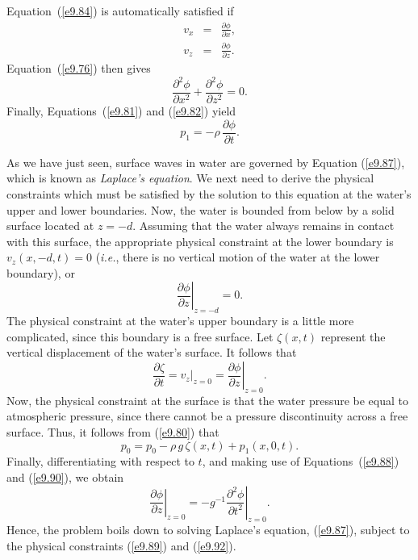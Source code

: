   Equation~(\ref{e9.84}) is automatically satisfied if
  \begin{eqnarray}
  v_x&=&\frac{\partial \phi}{\partial x},\\[0.5ex]
  v_z &=&\frac{\partial \phi}{\partial z}.
  \end{eqnarray}
  Equation~(\ref{e9.76}) then gives
  \begin{equation}\label{e9.87}
  \frac{\partial^2\phi}{\partial x^2} + \frac{\partial^2\phi}{\partial z^2} = 0.
  \end{equation}
  Finally, Equations~(\ref{e9.81}) and (\ref{e9.82}) yield
  \begin{equation}\label{e9.88}
  p_1 = -\rho\,\frac{\partial \phi}{\partial t}.
  \end{equation}

As we have just seen, surface waves in  water are governed by Equation (\ref{e9.87}),
which is known as {\em Laplace's equation}. We next need to derive the physical
constraints which must be satisfied by the solution to this equation at
the water's upper and lower boundaries. Now, the water is bounded from below by a
 solid surface located at $z=-d$. Assuming that the water always remains in contact
 with this surface, the appropriate physical constraint at the lower boundary is $v_z(x,-d,t)=0$ ({\em i.e.}, there is no vertical motion of the water at the lower boundary), or
 \begin{equation}\label{e9.89}
 \left.\frac{\partial \phi}{\partial z}\right|_{z=-d} = 0.
 \end{equation}
 The physical constraint at the water's upper boundary is a little more complicated, since this boundary is a free surface. 
 Let $\zeta(x,t)$ represent the vertical displacement of the water's surface. It
 follows that
 \begin{equation}\label{e9.90}
 \frac{\partial \zeta}{\partial t} = \left.v_z\right|_{z=0}=\left.\frac{\partial \phi}{\partial z}\right|_{z=0}.
 \end{equation}
Now, the physical constraint at the surface is that the water pressure be equal to atmospheric
pressure, since there cannot be a pressure discontinuity across a free surface. 
Thus, it follows from (\ref{e9.80}) that
\begin{equation}\label{e9.91}
p_0 = p_0 -\rho\,g\,\zeta(x,t) + p_1(x,0,t).
\end{equation}
Finally, differentiating with respect to $t$, and making use of Equations~(\ref{e9.88}) and (\ref{e9.90}), we obtain
\begin{equation}\label{e9.92}
\left.\frac{\partial \phi}{\partial z}\right|_{z=0} = -g^{-1}\left.\frac{\partial^2\phi}{\partial t^2}\right|_{z=0}.
\end{equation}
Hence, the problem boils down to solving Laplace's equation, (\ref{e9.87}), subject
to the physical constraints (\ref{e9.89}) and (\ref{e9.92}).

